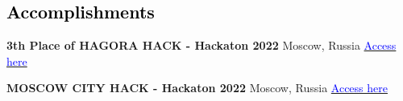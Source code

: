 \vspace{2mm}

\subsection{\textbf{\textcolor{black}{Accomplishments}}}

{\textbf{3th Place of HAGORA HACK - Hackaton 2022}}
{Moscow, Russia}
{}
{\href{https://drive.google.com/file/d/1MjIwztq8EHaUWi5ZaQ_WOLg9jh9dCqNJ/view?usp=sharing}{\textcolor{blue}{Access here}}}
{
}

{\textbf{MOSCOW CITY HACK - Hackaton 2022}}
{Moscow, Russia}
{}
{\href{https://drive.google.com/file/d/1lU0XHeSwSCHfnXBh4HtMRBv7wnWt3d8h/view?usp=sharing}{\textcolor{blue}{Access here}}}
{
}
